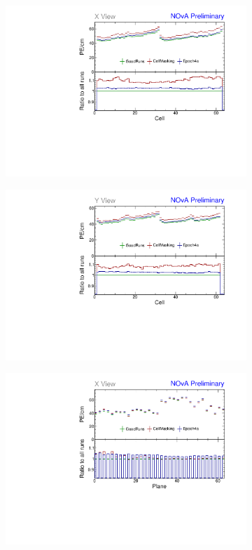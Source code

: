 \begin{figure}[!hbtp]
\begin{subfigure}[b]{0.495\textwidth}
\includegraphics[width=\textwidth]{Plots/TBCalibration/Attenprofs_P4Data_CellPE_X_Combined.pdf}
\end{subfigure}
\begin{subfigure}[b]{0.495\textwidth}
\centering
\includegraphics[width=\textwidth]{Plots/TBCalibration/Attenprofs_P4Data_CellPE_Y_Combined.pdf}
\end{subfigure}
\begin{subfigure}[b]{0.495\textwidth}
\centering
\includegraphics[width=\textwidth]{Plots/TBCalibration/Attenprofs_P4Data_PlanePE_X_Combined.pdf}

\end{subfigure}
\end{figure}
